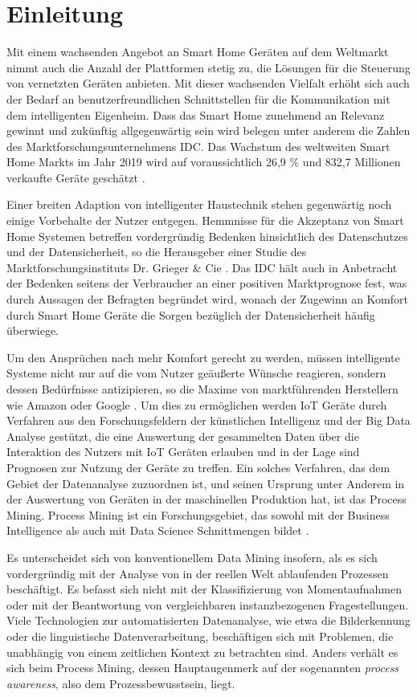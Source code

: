 \chapter{Einleitung}\label{chap:introduction}
Mit einem wachsenden Angebot an Smart Home Geräten auf dem Weltmarkt nimmt auch die Anzahl der Plattformen stetig zu, die Lösungen für die Steuerung von vernetzten Geräten anbieten. Mit dieser wachsenden Vielfalt erhöht sich auch der Bedarf an benutzerfreundlichen Schnittstellen für die Kommunikation mit dem intelligenten Eigenheim. Dass das Smart Home zunehmend an Relevanz gewinnt und zukünftig allgegenwärtig sein wird belegen unter anderem die Zahlen des Marktforschungsunternehmens IDC. Das Wachstum des weltweiten Smart Home Markts im Jahr 2019 wird auf voraussichtlich 26,9 \% und 832,7 Millionen verkaufte Geräte geschätzt \cite{IDC}.
 
Einer breiten Adaption von intelligenter Haustechnik stehen gegenwärtig noch einige Vorbehalte der Nutzer entgegen. Hemmnisse für die Akzeptanz von Smart Home Systemen betreffen vordergründig Bedenken hinsichtlich des Datenschutzes und der Datensicherheit, so die Herausgeber einer Studie des Marktforschungsinstituts Dr. Grieger \& Cie \cite{griegercie}. Das IDC hält auch in Anbetracht der Bedenken seitens der Verbraucher an einer positiven Marktprognose fest, was durch Aussagen der Befragten begründet wird, wonach der Zugewinn an Komfort durch Smart Home Geräte die Sorgen bezüglich der Datensicherheit häufig überwiege.
 
Um den Ansprüchen nach mehr Komfort gerecht zu werden, müssen intelligente Systeme nicht nur auf die vom Nutzer geäußerte Wünsche reagieren, sondern dessen Bedürfnisse antizipieren, so die Maxime von marktführenden Herstellern wie Amazon oder Google \cite{IoTGoogle}. Um dies zu ermöglichen werden IoT Geräte durch Verfahren aus den Forschungsfeldern der künstlichen Intelligenz und der Big Data Analyse gestützt, die eine Auswertung der gesammelten Daten über die Interaktion des Nutzers mit IoT Geräten erlauben und in der Lage sind Prognosen zur Nutzung der Geräte zu treffen. 
\newpage
Ein solches Verfahren, das dem Gebiet der Datenanalyse zuzuordnen ist, und seinen Ursprung unter Anderem in der Auswertung von Geräten in der maschinellen Produktion hat, ist das Process Mining. Process Mining ist ein Forschungsgebiet, das sowohl mit der Business Intelligence als auch mit Data Science Schnittmengen bildet \cite{PMinAction}. 

Es unterscheidet sich von konventionellem Data Mining insofern, als es sich vordergründig mit der Analyse von in der reellen Welt ablaufenden Prozessen beschäftigt. Es befasst sich nicht mit der Klassifizierung von Momentaufnahmen oder mit der Beantwortung von vergleichbaren instanzbezogenen Fragestellungen. Viele Technologien zur automatisierten Datenanalyse, wie etwa die Bilderkennung oder die linguistische Datenverarbeitung, beschäftigen sich mit Problemen, die unabhängig von einem zeitlichen Kontext zu betrachten sind. Anders verhält es sich beim Process Mining, dessen Hauptaugenmerk auf der sogenannten \textit{process awareness}, also dem Prozessbewusstsein, liegt.
